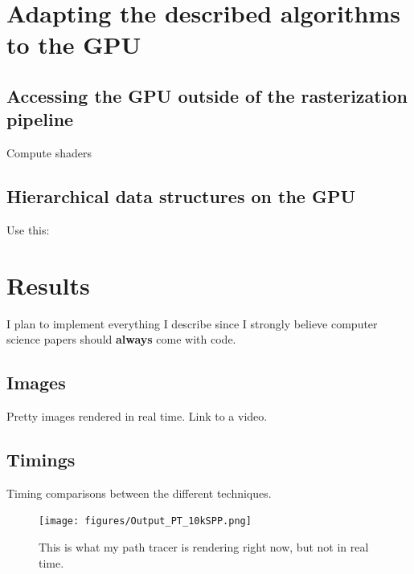 \documentclass{ACGSeminar}
\begin{document}

\section{Adapting the described algorithms to the GPU} \label{gpu-adapting}
\subsection{Accessing the GPU outside of the rasterization pipeline}
Compute shaders
\subsection{Hierarchical data structures on the GPU}
Use this: \cite{Karras:2012:MPC:2383795.2383801} \cite{Foley:2005}

\section{Results} \label{results}
I plan to implement everything I describe since I strongly believe computer science papers should \textbf{always} come with code.
\subsection{Images}
Pretty images rendered in real time. Link to a video.
\subsection{Timings}
Timing comparisons between the different techniques.


\begin{figure}[htb!]
  \begin{centering}
    \texttt{[image: figures/Output\_PT\_10kSPP.png]}\par
  \end{centering}
  \caption{This is what my path tracer is rendering right now, but not in real time.}
  \label{fig:pathtraced}
\end{figure}


\printbibliography
\end{document}
